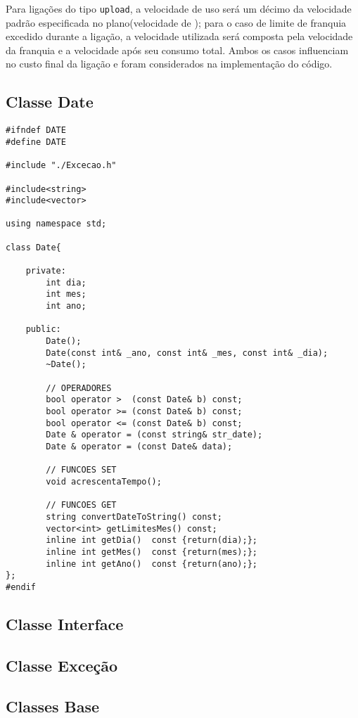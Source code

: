 Para ligações do tipo \texttt{upload}, a velocidade de uso será um décimo da velocidade padrão especificada no plano(velocidade de ); para o caso de limite de franquia excedido durante a ligação, a velocidade utilizada será composta pela velocidade da franquia e a velocidade após seu consumo total. Ambos os casos influenciam no custo final da ligação e foram considerados na implementação do código.


\subsection{Classe Date} \label{sec:date}

\begin{lstlisting}
#ifndef DATE
#define DATE

#include "./Excecao.h"

#include<string>
#include<vector>

using namespace std;

class Date{
	
	private:
		int dia;
		int mes;
		int ano;
	
	public:
		Date();
		Date(const int& _ano, const int& _mes, const int& _dia);
		~Date();
	
		// OPERADORES
		bool operator >  (const Date& b) const;
		bool operator >= (const Date& b) const;
		bool operator <= (const Date& b) const;
		Date & operator = (const string& str_date);
		Date & operator = (const Date& data);
		
		// FUNCOES SET
		void acrescentaTempo();
		
		// FUNCOES GET
		string convertDateToString() const;
		vector<int> getLimitesMes() const;
		inline int getDia()  const {return(dia);};
		inline int getMes()  const {return(mes);};
		inline int getAno()  const {return(ano);};
};
#endif
\end{lstlisting}

\subsection{Classe Interface} \label{sec:interface}

\subsection{Classe Exceção} \label{sec:excecao}

\subsection{Classes Base} \label{sec:classes_base}

